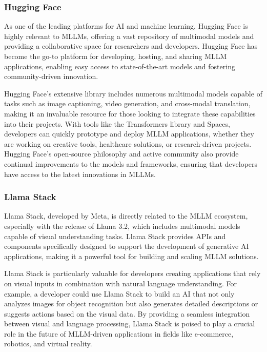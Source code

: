 \subsubsection{Hugging Face}

As one of the leading platforms for AI and machine learning, Hugging Face is highly relevant to MLLMs, offering a vast repository of multimodal models and providing a collaborative space for researchers and developers. 
Hugging Face has become the go-to platform for developing, hosting, and sharing MLLM applications, enabling easy access to state-of-the-art models and fostering community-driven innovation.

Hugging Face's extensive library includes numerous multimodal models capable of tasks such as image captioning, video generation, and cross-modal translation, making it an invaluable resource for those looking to integrate these capabilities into their projects. 
With tools like the Transformers library and Spaces, developers can quickly prototype and deploy MLLM applications, whether they are working on creative tools, healthcare solutions, or research-driven projects. 
Hugging Face's open-source philosophy and active community also provide continual improvements to the models and frameworks, ensuring that developers have access to the latest innovations in MLLMs.

\subsubsection{Llama Stack}

Llama Stack, developed by Meta, is directly related to the MLLM ecosystem, especially with the release of Llama 3.2, which includes multimodal models capable of visual understanding tasks. 
Llama Stack provides APIs and components specifically designed to support the development of generative AI applications, making it a powerful tool for building and scaling MLLM solutions.

Llama Stack is particularly valuable for developers creating applications that rely on visual inputs in combination with natural language understanding. 
For example, a developer could use Llama Stack to build an AI that not only analyzes images for object recognition but also generates detailed descriptions or suggests actions based on the visual data. 
By providing a seamless integration between visual and language processing, Llama Stack is poised to play a crucial role in the future of MLLM-driven applications in fields like e-commerce, robotics, and virtual reality.


